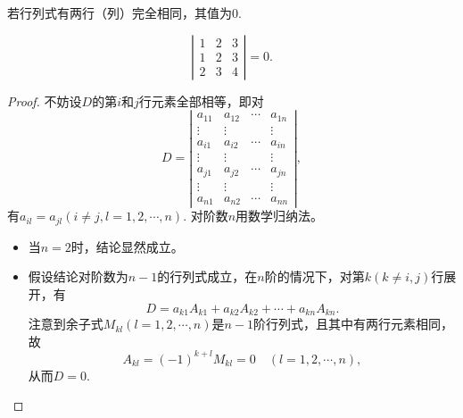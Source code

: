 \begin{frame}

\begin{xingzhi}
  若行列式有两行（列）完全相同，其值为$0$.
\end{xingzhi} \pause 

\begin{li}
	$$
	\left|
	\begin{array}{ccc}
	1 & 2 & 3\\
	1 & 2 & 3\\
	2 & 3 & 4
	\end{array}
	\right| = 0.
	$$
\end{li}

\end{frame}

\begin{frame} 
\begin{proof}
  不妨设$D$的第$i$和$j$行元素全部相等，即对
  $$
  D = \left|
    \begin{array}{cccc}
      a_{11}  &  a_{12} & \cdots & a_{1n} \\
      \vdots & \vdots &  & \vdots\\  
      a_{i1}  &  a_{i2} & \cdots & a_{in} \\
      \vdots & \vdots &  & \vdots\\  
      a_{j1}  &  a_{j2} & \cdots & a_{jn} \\
      \vdots & \vdots &  & \vdots\\  
      a_{n1}  &  a_{n2} & \cdots & a_{nn} 
    \end{array}
  \right|,
  $$
  有$a_{il}=a_{jl}(i\ne j, l=1,2,\cdots,n)$.
  对阶数$n$用数学归纳法。 \pause 
  \begin{itemize}
  \item 当$n=2$时，结论显然成立。\pause 
  \item 假设结论对阶数为$n-1$的行列式成立，在$n$阶的情况下，对第$k(k\ne i, j)$行展开，有
    $$
    D = a_{k1} A_{k1} + a_{k2} A_{k2} + \cdots + a_{kn} A_{kn}. 
    $$  \pause 
    注意到余子式$M_{kl}(l=1,2,\cdots,n)$是$n-1$阶行列式，且其中有两行元素相同，故
    $$
    A_{kl} = (-1)^{k+l} M_{kl} = 0\quad (l=1,2,\cdots,n),
    $$
    从而$D=0$.
  \end{itemize}
\end{proof}
\end{frame}

